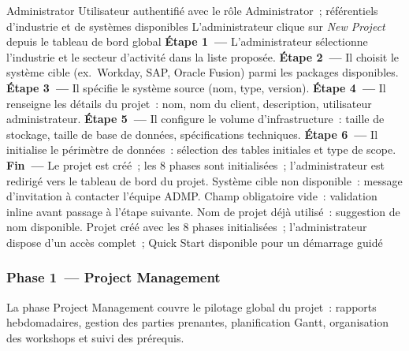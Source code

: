   {Administrator}
  {Utilisateur authentifié avec le rôle Administrator~; référentiels d'industrie et de systèmes disponibles}
  {L'administrateur clique sur \textit{New Project} depuis le tableau de bord global}
  {\textbf{Étape 1~---} L'administrateur sélectionne l'industrie et le secteur d'activité dans la liste proposée.\newline
   \textbf{Étape 2~---} Il choisit le système cible (ex.~Workday, SAP, Oracle Fusion) parmi les packages disponibles.\newline
   \textbf{Étape 3~---} Il spécifie le système source (nom, type, version).\newline
   \textbf{Étape 4~---} Il renseigne les détails du projet~: nom, nom du client, description, utilisateur administrateur.\newline
   \textbf{Étape 5~---} Il configure le volume d'infrastructure~: taille de stockage, taille de base de données, spécifications techniques.\newline
   \textbf{Étape 6~---} Il initialise le périmètre de données~: sélection des tables initiales et type de scope.\newline
   \textbf{Fin~---} Le projet est créé~; les 8 phases sont initialisées~; l'administrateur est redirigé vers le tableau de bord du projet.}
  {Système cible non disponible~: message d'invitation à contacter l'équipe ADMP. Champ obligatoire vide~: validation inline avant passage à l'étape suivante. Nom de projet déjà utilisé~: suggestion de nom disponible.}
  {Projet créé avec les 8 phases initialisées~; l'administrateur dispose d'un accès complet~; Quick Start disponible pour un démarrage guidé}

\iffalse %
\subsubsection*{Phase 1~--- Project Management}
\label{subsubsec:uc-phase1}

La phase Project Management couvre le pilotage global du projet~: rapports hebdomadaires, gestion des parties prenantes, planification Gantt, organisation des workshops et suivi des prérequis.

